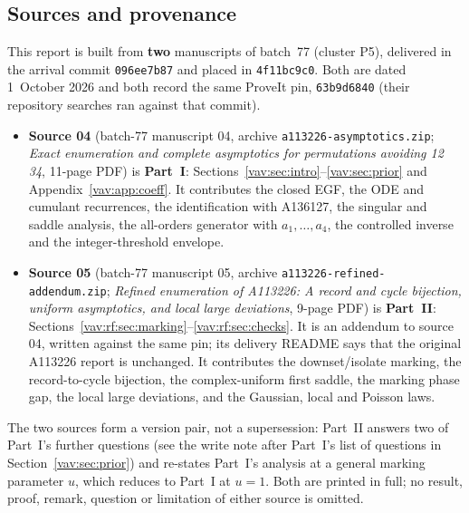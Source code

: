 \documentclass[11pt]{article}
\theoremstyle{remark}\newtheorem{remark}[theorem]{Remark}
\begin{document}
\subsection*{Sources and provenance}
This report is built from \textbf{two} manuscripts of batch~77 (cluster
P5), delivered in the arrival commit \texttt{096ee7b87} and placed in
\texttt{4f11bc9c0}. Both are dated 1~October 2026 and both record the
same ProveIt pin, \texttt{63b9d6840} (their repository searches ran
against that commit).
\begin{itemize}
\item \textbf{Source 04} (batch-77 manuscript 04, archive
\texttt{a113226-asymptotics.zip}; \emph{Exact enumeration and complete
asymptotics for permutations avoiding 12 34}, 11-page PDF) is
\textbf{Part~I}: Sections~\ref{vav:sec:intro}--\ref{vav:sec:prior} and
Appendix~\ref{vav:app:coeff}. It contributes the closed EGF, the ODE and
cumulant recurrences, the identification with A136127, the singular and
saddle analysis, the all-orders generator with $a_1,\ldots,a_4$, the
controlled inverse and the integer-threshold envelope.
\item \textbf{Source 05} (batch-77 manuscript 05, archive
\texttt{a113226-refined-addendum.zip}; \emph{Refined enumeration of
A113226: A record and cycle bijection, uniform asymptotics, and local
large deviations}, 9-page PDF) is \textbf{Part~II}:
Sections~\ref{vav:rf:sec:marking}--\ref{vav:rf:sec:checks}. It is an
addendum to source 04, written against the same pin; its delivery README
says that the original A113226 report is unchanged. It contributes the
downset/isolate marking, the record-to-cycle bijection, the complex-uniform
first saddle, the marking phase gap, the local large deviations, and the
Gaussian, local and Poisson laws.
\end{itemize}
The two sources form a version pair, not a supersession: Part~II
answers two of Part~I's further questions (see the write note after
Part~I's list of questions in Section~\ref{vav:sec:prior}) and re-states
Part~I's analysis at a general marking parameter $u$, which reduces to
Part~I at $u=1$. Both are printed in full; no result, proof, remark,
question or limitation of either source is omitted.
\end{document}

